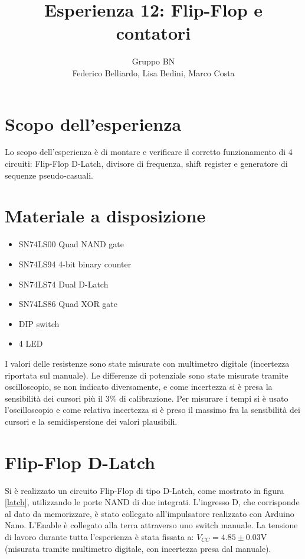 \documentclass[10pt,a4paper]{article}
\author{Gruppo BN \\ Federico Belliardo, Lisa Bedini, Marco Costa}
\title{Esperienza 12: Flip-Flop e contatori}
\begin{document}
\maketitle

\section{Scopo dell'esperienza}
Lo scopo dell'esperienza è di montare e verificare il corretto funzionamento di 4 circuiti: Flip-Flop D-Latch, divisore di frequenza, shift register e generatore di sequenze pseudo-casuali. %

\section{Materiale a disposizione}
\begin{itemize}
\item SN74LS00 Quad NAND gate
\item SN74LS94 4-bit binary counter
\item SN74LS74 Dual D-Latch
\item SN74LS86 Quad XOR gate
\item DIP switch
\item 4 LED
\end{itemize}
I valori delle resistenze sono state misurate con multimetro digitale (incertezza riportata sul manuale).
Le differenze di potenziale sono state misurate tramite oscilloscopio, se non indicato diversamente, e come incertezza si è presa la sensibilità dei cursori più il 3\% di calibrazione.
Per misurare i tempi si è usato l'oscilloscopio e come relativa incertezza si è preso il massimo fra la sensibilità dei cursori e la semidispersione dei valori plausibili.
\section{Flip-Flop D-Latch}
Si è realizzato un circuito Flip-Flop di tipo D-Latch, come mostrato in figura \ref{latch}, utilizzando le porte NAND di due integrati. L'ingresso D, che corrisponde al dato da memorizzare, è stato collegato all'impulsatore realizzato con Arduino Nano. L'Enable è collegato alla terra attraverso uno switch manuale. La tensione di lavoro durante tutta l'esperienza è stata fissata a: $V_{CC} = 4.85 \pm 0.03$V (misurata tramite multimetro digitale, con incertezza presa dal manuale).\\ 
\end{document}
